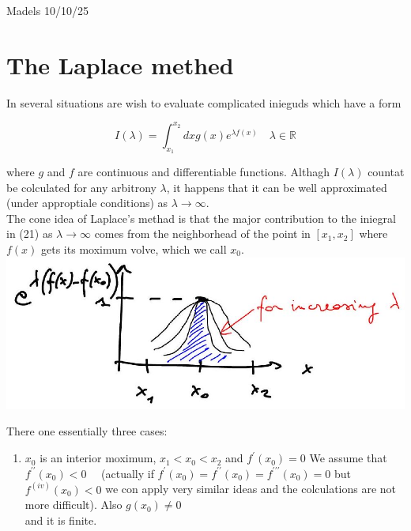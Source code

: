\documentclass[10pt]{article}
\begin{document}
Madels 10/10/25

\section*{The Laplace methed}
In several situations are wish to evaluate complicated inieguds which have a form


\begin{equation*}
I(\lambda)=\int_{x_{1}}^{x_{2}} d x g(x) e^{\lambda f(x)} \quad \lambda \in \mathbb{R} \tag{21}
\end{equation*}


where $g$ and $f$ are continuous and differentiable functions. Althagh $I(\lambda)$ countat be colculated for any arbitrony $\lambda$, it happens that it can be well approximated (under approptiale conditions) as $\lambda \rightarrow \infty$.\\
The cone idea of Laplace's methad is that the major contribution to the iniegral in (21) as $\lambda \rightarrow \infty$ comes from the neighborhead of the point in $\left[x_{1}, x_{2}\right]$ where $f(x)$ gets its moximum volve, which we call $x_{0}$.\\
\includegraphics[max width=\textwidth, center]{2025_10_19_6d9f59a2c3b97d481c52g-1}

There one essentially three cases:

\begin{enumerate}
  \item $x_{0}$ is an interior moximum, $x_{1}<x_{0}<x_{2}$ and $f^{\prime}\left(x_{0}\right)=0$ We assume that $f^{\prime \prime}\left(x_{0}\right)<0 \quad$ (actually if $f^{\prime}\left(x_{0}\right)=f^{\prime \prime}\left(x_{0}\right)=f^{\prime \prime \prime}\left(x_{0}\right)=0$ but $f^{(i v)}\left(x_{0}\right)<0$ we con apply very similar ideas and the colculations are not more difficult). Also $g\left(x_{0}\right) \neq 0$\\
and it is finite.
\end{enumerate}
\end{document}
